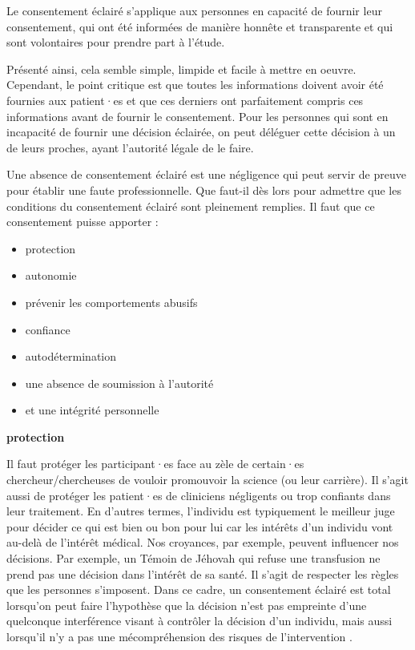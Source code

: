 \documentclass[
  12pt,
]{book}
\providecommand{\tightlist}{%
  \setlength{\itemsep}{0pt}\setlength{\parskip}{0pt}}
\begin{document}
Le consentement éclairé s'applique aux personnes en capacité de fournir leur consentement, qui ont été informées de manière honnête et transparente et qui sont volontaires pour prendre part à l'étude.

Présenté ainsi, cela semble simple, limpide et facile à mettre en oeuvre. Cependant, le point critique est que toutes les informations doivent avoir été fournies aux patient·es et que ces derniers ont parfaitement compris ces informations avant de fournir le consentement. Pour les personnes qui sont en incapacité de fournir une décision éclairée, on peut déléguer cette décision à un de leurs proches, ayant l'autorité légale de le faire.

Une absence de consentement éclairé est une négligence qui peut servir de preuve pour établir une faute professionnelle. Que faut-il dès lors pour admettre que les conditions du consentement éclairé sont pleinement remplies. Il faut que ce consentement puisse apporter :

\begin{itemize}
\tightlist
\item
  protection
\item
  autonomie
\item
  prévenir les comportements abusifs
\item
  confiance
\item
  autodétermination
\item
  une absence de soumission à l'autorité
\item
  et une intégrité personnelle
\end{itemize}

\textbf{protection}

Il faut protéger les participant·es face au zèle de certain·es chercheur/chercheuses de vouloir promouvoir la science (ou leur carrière). Il s'agit aussi de protéger les patient·es de cliniciens négligents ou trop confiants dans leur traitement. En d'autres termes, l'individu est typiquement le meilleur juge pour décider ce qui est bien ou bon pour lui \citep{Mill2003} car les intérêts d'un individu vont au-delà de l'intérêt médical. Nos croyances, par exemple, peuvent influencer nos décisions. Par exemple, un Témoin de Jéhovah qui refuse une transfusion ne prend pas une décision dans l'intérêt de sa santé. Il s'agit de respecter les règles que les personnes s'imposent. Dans ce cadre, un consentement éclairé est total lorsqu'on peut faire l'hypothèse que la décision n'est pas empreinte d'une quelconque interférence visant à contrôler la décision d'un individu, mais aussi lorsqu'il n'y a pas une mécompréhension des risques de l'intervention \citep{Beauchamp2009}.
\end{document}
